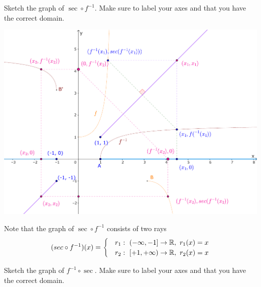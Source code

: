 \documentclass{article}
\begin{document}
\newpage

\begin{problem*}[1c]
    Sketch the graph of $\sec \circ f^{-1}.$ Make sure to label your axes and that you have the correct domain.
\end{problem*}

\begin{center}
    \includegraphics[width=16cm]{./svg/pdf/derivative-2-1c.pdf}
\end{center}

\begin{soln}
    Note that the graph of $\sec \circ f^{-1}$ consists of two rays
    \[
        (sec \circ f^{-1})(x) = 
        \begin{cases}
            &r_1:\ \left( -\infty, -1 \right] \rightarrow \RR,\ r_1(x) = x\\
            &r_2:\ \left[ +1, +\infty \right) \rightarrow \RR,\ r_2(x) = x\\
        \end{cases}
    \]
\end{soln}

\newpage

\begin{problem*}[1d]
    Sketch the graph of $f^{-1} \circ \sec.$ Make sure to label your axes and that you have the correct domain.
\end{problem*}
\end{document}
